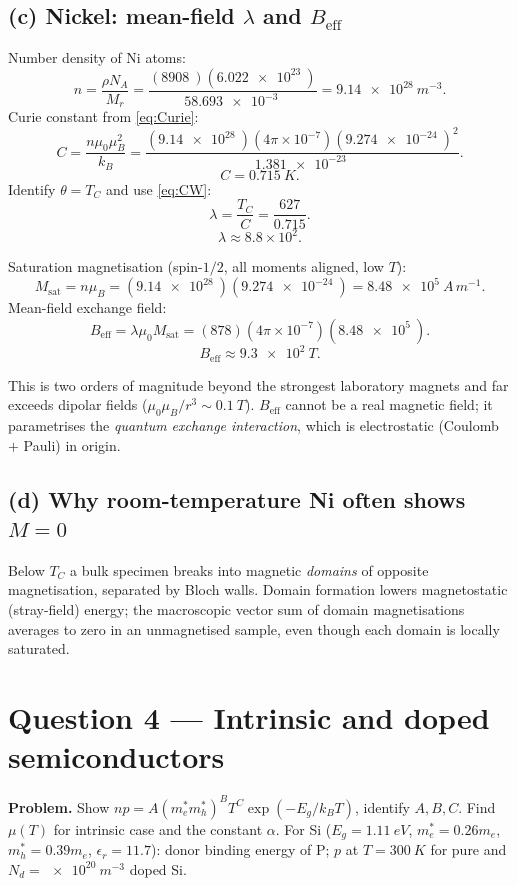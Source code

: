 \documentclass[11pt]{article}
\begin{document}
\subsection*{(c) Nickel: mean-field $\lambda$ and $B_\text{eff}$}

Number density of Ni atoms:
\[ n = \frac{\rho N_{A}}{M_{r}} = \frac{(\SI{8908}{})(\SI{6.022e23}{})}{\SI{58.693e-3}{}} = \SI{9.14e28}{m^{-3}}. \]
Curie constant from \eqref{eq:Curie}:
\[ C = \frac{n\mu_{0}\mu_{B}^{2}}{k_{B}} = \frac{(\SI{9.14e28}{})(4\pi\times 10^{-7})(\SI{9.274e-24}{})^{2}}{\SI{1.381e-23}{}}. \]
\[ C = \SI{0.715}{K}. \]
Identify $\theta=T_{C}$ and use \eqref{eq:CW}:
\[ \lambda = \frac{T_{C}}{C} = \frac{627}{0.715}. \]
\[ \boxed{\;\lambda \approx 8.8\times 10^{2}.\;} \]

Saturation magnetisation (spin-$1/2$, all moments aligned, low $T$):
\[ M_\text{sat} = n\mu_{B} = (\SI{9.14e28}{})(\SI{9.274e-24}{}) = \SI{8.48e5}{A\,m^{-1}}. \]
Mean-field exchange field:
\[ B_\text{eff} = \lambda\mu_{0}M_\text{sat} = (878)(4\pi\times 10^{-7})(\SI{8.48e5}{}). \]
\[ \boxed{\;B_\text{eff}\approx \SI{9.3e2}{T}.\;} \]

This is two orders of magnitude beyond the strongest laboratory magnets and far exceeds dipolar fields ($\mu_{0}\mu_{B}/r^{3}\sim\SI{0.1}{T}$). $B_\text{eff}$ cannot be a real magnetic field; it parametrises the \emph{quantum exchange interaction}, which is electrostatic (Coulomb $+$ Pauli) in origin.

\subsection*{(d) Why room-temperature Ni often shows $M=0$}

Below $T_{C}$ a bulk specimen breaks into magnetic \emph{domains} of opposite magnetisation, separated by Bloch walls. Domain formation lowers magnetostatic (stray-field) energy; the macroscopic vector sum of domain magnetisations averages to zero in an unmagnetised sample, even though each domain is locally saturated.

\section*{Question 4 --- Intrinsic and doped semiconductors}

\textbf{Problem.} Show $np=A(m_{e}^{*}m_{h}^{*})^{B}T^{C}\exp(-E_{g}/k_{B}T)$, identify $A,B,C$. Find $\mu(T)$ for intrinsic case and the constant $\alpha$. For Si ($E_{g}=\SI{1.11}{eV}$, $m_{e}^{*}=0.26 m_{e}$, $m_{h}^{*}=0.39 m_{e}$, $\epsilon_{r}=11.7$): donor binding energy of P; $p$ at $T=\SI{300}{K}$ for pure and $N_{d}=\SI{e20}{m^{-3}}$ doped Si.
\end{document}
